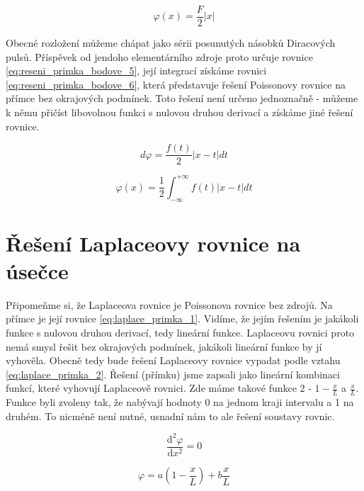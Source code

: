 \documentclass{book}
\begin{document}
\begin{equation}
\label{eq:reseni_primka_bodove_4}
\varphi(x) = \frac{F}{2} | x |
\end{equation}

Obecné rozložení můžeme chápat jako sérii posunutých násobků Diracových pulsů. Příspěvek od jendoho elementárního zdroje proto určuje rovnice \eqref{eq:reseni_primka_bodove_5}, její integrací získáme
rovnici \eqref{eq:reseni_primka_bodove_6}, která představuje řešení Poissonovy rovnice na přímce bez okrajových podmínek. Toto řešení není určeno jednoznačně - můžeme k němu přičíst libovolnou
funkci s nulovou druhou derivací a získáme jiné řešení rovnice.

\begin{equation}
\label{eq:reseni_primka_bodove_5}
d \varphi = \frac{f(t)}{2} | x - t| dt
\end{equation}

\begin{equation}
\label{eq:reseni_primka_bodove_6}
\varphi(x) = \frac{1}{2} \int_{-\infty}^{+\infty} f(t) | x - t| dt
\end{equation}

\section{Řešení Laplaceovy rovnice na úsečce}

Připomeňme si, že Laplaceova rovnice je Poissonova rovnice bez zdrojů. Na přímce je její rovnice \eqref{eq:laplace_primka_1}. Vidíme, že jejím řešením je jakákoli funkce s nulovou druhou derivací,
tedy lineární funkce. Laplaceovu rovnici proto nemá smysl řešit bez okrajových podmínek, jakákoli lineární funkce by jí vyhověla.
Obecně tedy bude řešení Laplaceovy rovnice vypadat podle vztahu \eqref{eq:laplace_primka_2}. Řešení (přímku) jsme zapsali jako lineární kombinaci
funkcí, které vyhovují Laplaceově rovnici. Zde máme takové funkce 2 - \(1 - \frac{x}{L}\) a \(\frac{x}{L}\). Funkce byli zvoleny tak, že nabývají
hodnoty 0 na jednom kraji intervalu a 1 na druhém. To nicméně není nutné, usnadní nám to ale řešení soustavy rovnic.

\begin{equation}
\label{eq:laplace_primka_1}
\frac{\mathrm{d}^2 \varphi}{\mathrm{d}x^2} = 0
\end{equation}

\begin{equation}
\label{eq:laplace_primka_2}
\varphi = a (1 - \frac{x}{L}) + b \frac{x}{L}
\end{equation}
\end{document}
